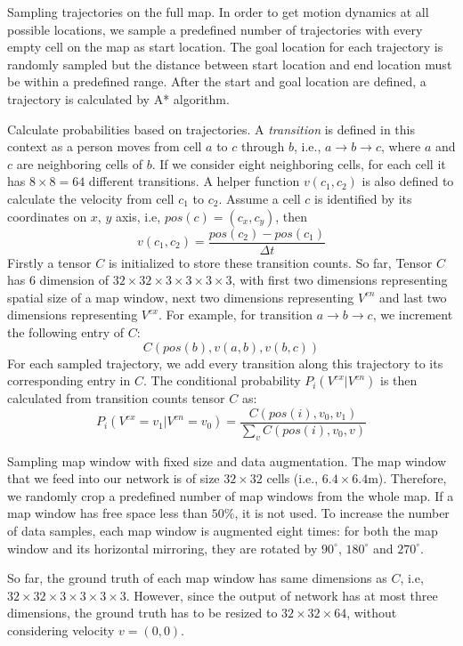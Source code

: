 \begin{my_enumerate}
\item Sampling trajectories on the full map. In order to get motion dynamics at all possible locations, we sample a predefined number of trajectories with every empty cell on the map as start location. The goal location for each trajectory is randomly sampled but the distance between start location and end location must be within a predefined range. After the start and goal location are defined, a trajectory is calculated by A* algorithm.
\item Calculate probabilities based on trajectories. A \textit{transition} is defined in this context as a person moves from cell $a$ to $c$ through $b$, i.e., $a \rightarrow b \rightarrow c$, where $a$ and $c$ are neighboring cells of $b$. If we consider eight neighboring cells, for each cell it has $8\times8=64$ different transitions. A helper function $v(c_1,c_2)$ is also defined to calculate the velocity from cell $c_1$ to $c_2$. Assume a cell $c$ is identified by its coordinates on $x$, $y$ axis, i.e, $pos(c)=(c_x, c_y)$, then
\[v(c_1, c_2)=\frac{pos(c_2)-pos(c_1)}{\Delta t}\]
Firstly a tensor $C$ is initialized to store these transition counts. So far, Tensor $C$ has 6 dimension of $32\times32\times3\times3\times3\times3$, with first two dimensions representing spatial size of a map window, next two dimensions representing $V^{en}$ and last two dimensions representing $V^{ex}$. For example, for transition $a \rightarrow b \rightarrow c$, we increment the following entry of $C$:
\[ C(pos(b), v(a, b), v(b, c))\]
For each sampled trajectory, we add every transition along this trajectory to its corresponding entry in $C$. The conditional probability $P_i(V^{ex}|V^{en})$ is then calculated from transition counts tensor $C$ as:
\begin{equation}
P_i(V^{ex}=v_1|V^{en}=v_0) = \frac{C(pos(i), v_0, v_1)}{\sum_{ v}C(pos(i), v_0, v)}
\end{equation}
\item Sampling map window with fixed size and data augmentation. The map window that we feed into our network is of size $32\times32$ cells (i.e., $6.4 \times 6.4$m). Therefore, we randomly crop a predefined number of map windows from the whole map. If a map window has free space less than $50\%$, it is not used. To increase the number of data samples, each map window is augmented eight times: for both the map window and its horizontal mirroring, they are rotated by $90^\circ$, $180^\circ$ and $270^\circ$. 

  So far, the ground truth of each map window has same dimensions as $C$, i.e, $32\times32\times3\times3\times3\times3$. However, since the output of network has at most three dimensions, the ground truth has to be resized to $32\times32\times64$, without considering velocity $v=(0, 0)$.
\end{my_enumerate}

